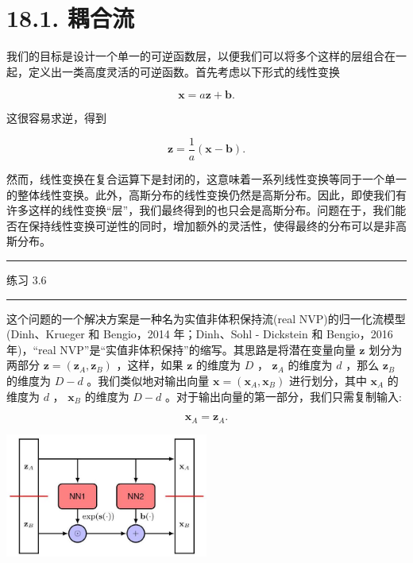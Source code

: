 \documentclass[10pt]{report}
\newcommand{\HRule}{\begin{center}\rule{0.9\linewidth}{0.2mm}\end{center}}
\begin{document}
\section*{18.1. 耦合流}

我们的目标是设计一个单一的可逆函数层，以便我们可以将多个这样的层组合在一起，定义出一类高度灵活的可逆函数。首先考虑以下形式的线性变换

\[
\mathbf{x} = a\mathbf{z} + \mathbf{b}. \tag{18.8}
\]

这很容易求逆，得到

\[
\mathbf{z} = \frac{1}{a}\left( {\mathbf{x} - \mathbf{b}}\right) . \tag{18.9}
\]

然而，线性变换在复合运算下是封闭的，这意味着一系列线性变换等同于一个单一的整体线性变换。此外，高斯分布的线性变换仍然是高斯分布。因此，即使我们有许多这样的线性变换“层”，我们最终得到的也只会是高斯分布。问题在于，我们能否在保持线性变换可逆性的同时，增加额外的灵活性，使得最终的分布可以是非高斯分布。

\HRule

练习 3.6

\HRule

这个问题的一个解决方案是一种名为实值非体积保持流(real NVP)的归一化流模型(Dinh、Krueger 和 Bengio，2014 年；Dinh、Sohl - Dickstein 和 Bengio，2016 年)，“real NVP”是“实值非体积保持”的缩写。其思路是将潜在变量向量 \(\mathbf{z}\) 划分为两部分 \(\mathbf{z} = \left( {{\mathbf{z}}_{A},{\mathbf{z}}_{B}}\right)\) ，这样，如果 \(\mathbf{z}\) 的维度为 \(D\) ， \({\mathbf{z}}_{A}\) 的维度为 \(d\) ，那么 \({\mathbf{z}}_{B}\) 的维度为 \(D - d\) 。我们类似地对输出向量 \(\mathbf{x} = \left( {{\mathbf{x}}_{A},{\mathbf{x}}_{B}}\right)\) 进行划分，其中 \({\mathbf{x}}_{A}\) 的维度为 \(d\) ， \({\mathbf{x}}_{B}\) 的维度为 \(D - d\) 。对于输出向量的第一部分，我们只需复制输入:

\[
{\mathbf{x}}_{A} = {\mathbf{z}}_{A}. \tag{18.10}
\]

\begin{center}
\includegraphics[max width=0.5\textwidth]{images/0194e279-9b28-703a-88f4-c3ac21e2010d_569_836_343_664_407_0.jpg}
\end{center}
\hspace*{3em} 
\end{document}
